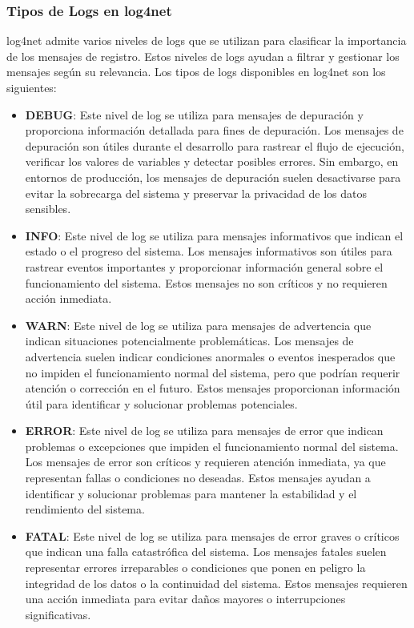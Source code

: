 \documentclass[executivepaper]{article}
\begin{document}
\subsubsection*{Tipos de Logs en log4net}

log4net admite varios niveles de logs que se utilizan para clasificar la importancia de los mensajes de registro. Estos niveles de logs ayudan a filtrar y gestionar los mensajes según su relevancia. Los tipos de logs disponibles en log4net son los siguientes:

\begin{itemize}
  \item \textbf{DEBUG}: Este nivel de log se utiliza para mensajes de depuración y proporciona información detallada para fines de depuración. Los mensajes de depuración son útiles durante el desarrollo para rastrear el flujo de ejecución, verificar los valores de variables y detectar posibles errores. Sin embargo, en entornos de producción, los mensajes de depuración suelen desactivarse para evitar la sobrecarga del sistema y preservar la privacidad de los datos sensibles.

  \item \textbf{INFO}: Este nivel de log se utiliza para mensajes informativos que indican el estado o el progreso del sistema. Los mensajes informativos son útiles para rastrear eventos importantes y proporcionar información general sobre el funcionamiento del sistema. Estos mensajes no son críticos y no requieren acción inmediata.

  \item \textbf{WARN}: Este nivel de log se utiliza para mensajes de advertencia que indican situaciones potencialmente problemáticas. Los mensajes de advertencia suelen indicar condiciones anormales o eventos inesperados que no impiden el funcionamiento normal del sistema, pero que podrían requerir atención o corrección en el futuro. Estos mensajes proporcionan información útil para identificar y solucionar problemas potenciales.

  \item \textbf{ERROR}: Este nivel de log se utiliza para mensajes de error que indican problemas o excepciones que impiden el funcionamiento normal del sistema. Los mensajes de error son críticos y requieren atención inmediata, ya que representan fallas o condiciones no deseadas. Estos mensajes ayudan a identificar y solucionar problemas para mantener la estabilidad y el rendimiento del sistema.

  \item \textbf{FATAL}: Este nivel de log se utiliza para mensajes de error graves o críticos que indican una falla catastrófica del sistema. Los mensajes fatales suelen representar errores irreparables o condiciones que ponen en peligro la integridad de los datos o la continuidad del sistema. Estos mensajes requieren una acción inmediata para evitar daños mayores o interrupciones significativas.

\end{itemize}
\end{document}
